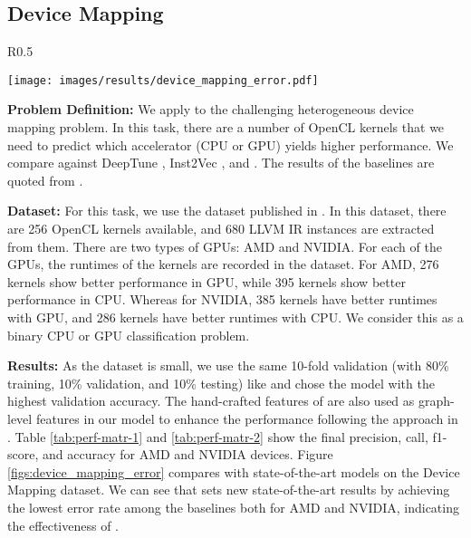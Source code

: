 \subsection{Device Mapping}
\vspace{-4pt}
\begin{wrapfigure}{R}{0.5\textwidth}
\vspace{-20pt}
  \begin{center}
\texttt{[image: images/results/device\_mapping\_error.pdf]}
\vspace{-8pt}
\captionsetup{justification=centering}
\caption{Performance comparison the device mapping task with state-of-the-art models [lower is better].}
\vspace{-15pt}
\label{figs:device_mapping_error}
  \end{center}
\end{wrapfigure}
\textbf{Problem Definition:}
We apply \ourtool to the challenging heterogeneous device mapping \cite{cummins2017end} problem.
In this task, there are a number of OpenCL kernels that we need to predict which accelerator (CPU or GPU) yields higher performance. We compare \ourtool against DeepTune \cite{cummins2017end}, Inst2Vec \cite{ben2018neural}, and \programl \cite{cummins2020programl}. The results of the baselines are quoted from \cite{cummins2020programl}.

\textbf{Dataset:}
For this task, we use the dataset published in \cite{cummins2017end}. In this dataset, there are 256 OpenCL kernels available, and 680 LLVM IR instances are extracted from them.
There are two types of GPUs: AMD and NVIDIA. For each of the GPUs, the runtimes of the kernels are recorded in the dataset. For AMD, 276 kernels show better performance in GPU, while 395 kernels show better performance in CPU. Whereas for NVIDIA, 385 kernels have better runtimes with GPU, and 286 kernels have better runtimes with CPU. We consider this as a binary CPU or GPU classification problem.


\textbf{Results:} 
As the dataset is small, we use the same 10-fold validation (with 80\% training, 10\% validation, and 10\% testing) like \programl \cite{cummins2020programl} and chose the model with the highest validation accuracy.
The hand-crafted features of \cite{grewe2013portable} are also used as graph-level features in our model to enhance the performance following the approach in \cite{cummins2020programl}.
Table \ref{tab:perf-matr-1} and \ref{tab:perf-matr-2} show the final precision, call, f1-score, and accuracy for AMD and NVIDIA devices. Figure \ref{figs:device_mapping_error} compares \ourtool with state-of-the-art models on the Device Mapping dataset.
We can see that \ourtool sets new state-of-the-art results by achieving the lowest error rate among the baselines both for AMD and NVIDIA, indicating the effectiveness of \ourtool.

